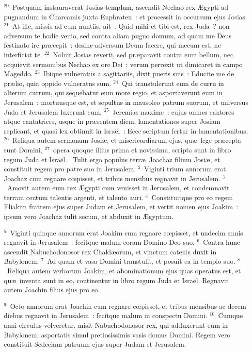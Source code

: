 ${}^{20}$~Postquam instauraverat Josias templum, ascendit Nechao rex \AE gypti ad pugnandum in Charcamis juxta Euphraten~: et processit in occursum ejus Josias.
${}^{21}$~At ille, missis ad eum nuntiis, ait~: Quid mihi et tibi est, rex Juda~? non adversum te hodie venio, sed contra aliam pugno domum, ad quam me Deus festinato ire pr\ae cepit~: desine adversum Deum facere, qui mecum est, ne interficiat te.
${}^{22}$~Noluit Josias reverti, sed pr\ae paravit contra eum bellum, nec acquievit sermonibus Nechao ex ore Dei~: verum perrexit ut dimicaret in campo Mageddo.
${}^{23}$~Ibique vulneratus a sagittariis, dixit pueris suis~: Educite me de pr\ae lio, quia oppido vulneratus sum.
${}^{24}$~Qui transtulerunt eum de curru in alterum currum, qui sequebatur eum more regio, et asportaverunt eum in Jerusalem~: mortuusque est, et sepultus in mausoleo patrum suorum, et universus Juda et Jerusalem luxerunt eum.
${}^{25}$~Jeremias maxime~: cujus omnes cantores atque cantatrices, usque in pr\ae sentem diem, lamentationes super Josiam replicant, et quasi lex obtinuit in Isra\"el~: Ecce scriptum fertur in lamentationibus.
${}^{26}$~Reliqua autem sermonum Josi\ae , et misericordiarum ejus, qu\ae\ lege pr\ae cepta sunt Domini,
${}^{27}$~opera quoque illius prima et novissima, scripta sunt in libro regum Juda et Isra\"el.
~\lettrine[lines=10,image=true,loversize=0.05,lraise=-0.03]{T}{}ulit ergo populus terr\ae\ Joachaz filium Josi\ae , et constituit regem pro patre suo in Jerusalem.
${}^{2}$~Viginti trium annorum erat Joachaz cum regnare cœpisset, et tribus mensibus regnavit in Jerusalem.
${}^{3}$~Amovit autem eum rex \AE gypti cum venisset in Jerusalem, et condemnavit terram centum talentis argenti, et talento auri.
${}^{4}$~Constituitque pro eo regem Eliakim fratrem ejus super Judam et Jerusalem, et vertit nomen ejus Joakim~: ipsum vero Joachaz tulit secum, et abduxit in \AE gyptum.


${}^{5}$~Viginti quinque annorum erat Joakim cum regnare cœpisset, et undecim annis regnavit in Jerusalem~: fecitque malum coram Domino Deo suo.
${}^{6}$~Contra hunc ascendit Nabuchodonosor rex Chald\ae orum, et vinctum catenis duxit in Babylonem.
${}^{7}$~Ad quam et vasa Domini transtulit, et posuit ea in templo suo.
${}^{8}$~Reliqua autem verborum Joakim, et abominationum ejus quas operatus est, et qu\ae\ inventa sunt in eo, continentur in libro regum Juda et Isra\"el. Regnavit autem Joachin filius ejus pro eo.


${}^{9}$~Octo annorum erat Joachin cum regnare cœpisset, et tribus mensibus ac decem diebus regnavit in Jerusalem~: fecitque malum in conspectu Domini.
${}^{10}$~Cumque anni circulus volveretur, misit Nabuchodonosor rex, qui adduxerunt eum in Babylonem, asportatis simul pretiosissimis vasis domus Domini. Regem vero constituit Sedeciam patruum ejus super Judam et Jerusalem.


